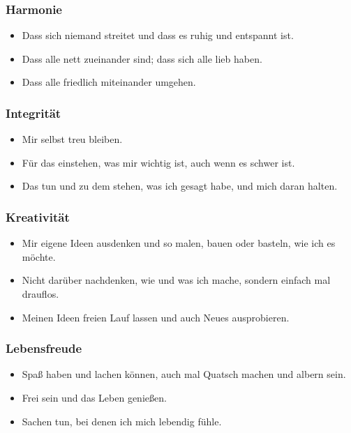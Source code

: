 \subsubsection{Harmonie}

\begin{itemize}
    \item Dass sich niemand streitet und dass es ruhig und entspannt ist.
    \item Dass alle nett zueinander sind; dass sich alle lieb haben.
    \item Dass alle friedlich miteinander umgehen.
\end{itemize}

\subsubsection{Integrität}

\begin{itemize}
    \item Mir selbst treu bleiben.
    \item Für das einstehen, was mir wichtig ist, auch wenn es schwer ist.
    \item Das tun und zu dem stehen, was ich gesagt habe, und mich daran halten.
\end{itemize}

\subsubsection{Kreativität}

\begin{itemize}
    \item Mir eigene Ideen ausdenken und so malen, bauen oder basteln, wie ich es möchte.
    \item Nicht darüber nachdenken, wie und was ich mache, sondern einfach mal drauflos.
    \item Meinen Ideen freien Lauf lassen und auch Neues ausprobieren.
\end{itemize}

\subsubsection{Lebensfreude}

\begin{itemize}
    \item Spaß haben und lachen können, auch mal Quatsch machen und albern sein.
    \item Frei sein und das Leben genießen.
    \item Sachen tun, bei denen ich mich lebendig fühle.
\end{itemize}

